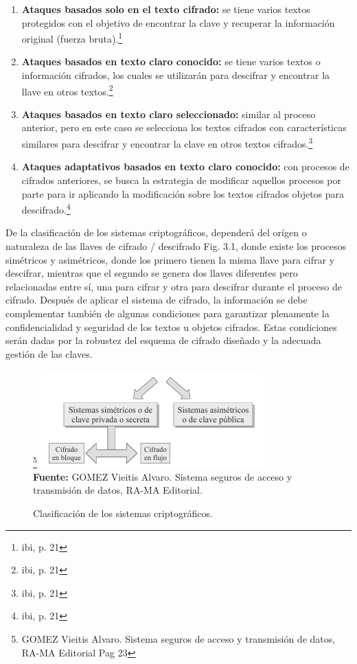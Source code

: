 \documentclass[a4paper,openright,12pt]{book}
\theoremstyle{definition}
\theoremstyle{remark}
\begin{document}
\begin{enumerate}
	\item \textbf{Ataques basados solo en el texto cifrado:}  se tiene varios textos protegidos con el objetivo de encontrar la clave y recuperar la información original (fuerza bruta).\footnote{ibi, p. 21}
    \item \textbf{Ataques basados en texto claro conocido:} se tiene varios textos o información cifrados, los cuales se utilizarán para descifrar y encontrar la llave en otros textos.\footnote{ibi, p.  21}
    \item \textbf{Ataques basados en texto claro seleccionado:} similar al proceso anterior, pero en este caso se selecciona los textos cifrados con características similares para descifrar y encontrar la clave en otros textos cifrados.\footnote{ibi, p. 21}
    \item \textbf{Ataques adaptativos basados en texto claro conocido: } con procesos de cifrados anteriores, se busca la estrategia de modificar aquellos procesos por parte para ir aplicando la modificación sobre los textos cifrados objetos para descifrado.\footnote{ibi, p. 21}
\end{enumerate}

De la clasificación de los sistemas criptográficos, dependerá del orígen o naturaleza de las llaves de cifrado / descifrado Fig. 3.1, donde existe los procesos simétricos y asimétricos, donde los primero tienen la misma llave para cifrar y descifrar, mientras que el segundo se genera dos llaves diferentes pero relacionadas entre sí, una para cifrar y otra para descifrar durante el proceso de cifrado. Después de aplicar el sistema de cifrado, la información se debe complementar también de algunas condiciones para garantizar plenamente la confidencialidad y seguridad de los textos u objetos cifrados. Estas condiciones serán dadas por la robustez del esquema de cifrado diseñado y la adecuada gestión de las claves.

\begin{figure}[htb]
\centering
\caption{Clasificación de los sistemas criptográficos.}\footnote{GOMEZ Vieitis Alvaro. Sistema seguros de acceso y transmisión de datos, RA-MA Editorial Pag 23}
\includegraphics[scale=0.8]{ClasificacionCripto}
\label{fig:ClasificacionCripto}
\\\textbf{Fuente:} GOMEZ Vieitis Alvaro. Sistema seguros de acceso y transmisión de datos, RA-MA Editorial.
\end{figure}
\end{document}
